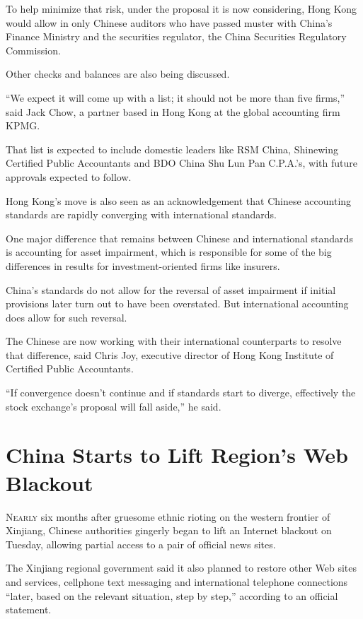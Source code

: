 ﻿\documentclass[12pt]{article}
\begin{document}
To help minimize that risk, under the proposal it is now considering, Hong Kong would allow in only
Chinese auditors who have passed muster with China's Finance Ministry and the securities regulator,
the China Securities Regulatory Commission.

Other checks and balances are also being discussed.

``We expect it will come up with a list; it should not be more than five firms,'' said Jack Chow, a
partner based in Hong Kong at the global accounting firm KPMG.

That list is expected to include domestic leaders like RSM China, Shinewing Certified Public
Accountants and BDO China Shu Lun Pan C.P.A.'s, with future approvals expected to follow.

Hong Kong's move is also seen as an acknowledgement that Chinese accounting standards are rapidly
converging with international standards.

One major difference that remains between Chinese and international standards is accounting for
asset impairment, which is responsible for some of the big differences in results for
investment-oriented firms like insurers.

China's standards do not allow for the reversal of asset impairment if initial provisions later turn
out to have been overstated. But international accounting does allow for such reversal.

The Chinese are now working with their international counterparts to resolve that difference, said
Chris Joy, executive director of Hong Kong Institute of Certified Public Accountants.

``If convergence doesn't continue and if standards start to diverge, effectively the stock
exchange's proposal will fall aside,'' he said.

\section{China Starts to Lift Region's Web Blackout}

\lettrine{N}{early} six months after gruesome ethnic rioting on the western
frontier of Xinjiang, Chinese authorities gingerly began to lift an Internet blackout on Tuesday,
allowing partial access to a pair of official news sites.

The Xinjiang regional government said it also planned to restore other Web sites and services,
cellphone text messaging and international telephone connections ``later, based on the relevant
situation, step by step,'' according to an official statement.
\end{document}
